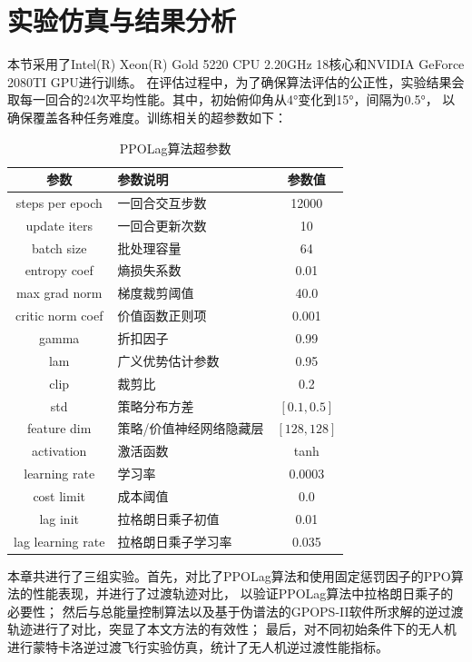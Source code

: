 \section{实验仿真与结果分析}
本节采用了Intel(R) Xeon(R) Gold 5220 CPU 2.20GHz 18核心和NVIDIA GeForce 2080TI GPU进行训练。
在评估过程中，为了确保算法评估的公正性，实验结果会取每一回合的24次平均性能。其中，初始俯仰角从4°变化到15°，间隔为0.5°，
以确保覆盖各种任务难度。训练相关的超参数如下：
\begin{table}[htbp]
    \caption{\label{tab:algoconfig}PPOLag算法超参数}
    \begin{tabularx}{\linewidth}{|c|X|c|}
        \hline
        参数 & 参数说明 & 参数值 \\ \hline
        steps per epoch & 一回合交互步数 & 12000 \\ \hline
        update iters & 一回合更新次数 & 10 \\ \hline
        batch size & 批处理容量 & 64 \\ \hline
        entropy coef & 熵损失系数 & 0.01 \\ \hline
        max grad norm & 梯度裁剪阈值 & 40.0 \\ \hline
        critic norm coef & 价值函数正则项 & 0.001 \\ \hline
        gamma & 折扣因子 & 0.99 \\ \hline
        lam & 广义优势估计参数 & 0.95 \\ \hline
        clip & 裁剪比 & 0.2 \\ \hline
        std & 策略分布方差 & $[0.1,0.5]$ \\ \hline
        feature dim & 策略/价值神经网络隐藏层 & $[128,128]$ \\ \hline
        activation & 激活函数 & tanh \\ \hline
        learning rate & 学习率 & 0.0003 \\ \hline
        cost limit & 成本阈值 & 0.0 \\ \hline
        lag init & 拉格朗日乘子初值 & 0.01 \\ \hline
        lag learning rate & 拉格朗日乘子学习率 & 0.035 \\ \hline
    \end{tabularx}
\end{table}


本章共进行了三组实验。首先，对比了PPOLag算法和使用固定惩罚因子的PPO算法的性能表现，并进行了过渡轨迹对比，
以验证PPOLag算法中拉格朗日乘子的必要性；
然后与总能量控制算法以及基于伪谱法的GPOPS-II软件所求解的逆过渡轨迹进行了对比，突显了本文方法的有效性；
最后，对不同初始条件下的无人机进行蒙特卡洛逆过渡飞行实验仿真，统计了无人机逆过渡性能指标。

